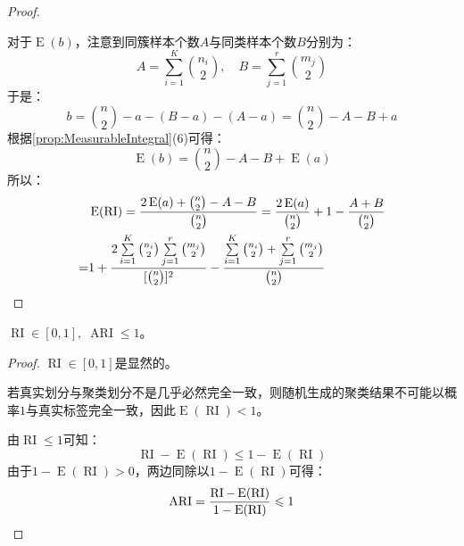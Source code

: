 \begin{proof}
\begin{equation*}
	\end{equation*}\par
	对于$\operatorname{E}(b)$，注意到同簇样本个数$A$与同类样本个数$B$分别为：
	\begin{equation*}
		A=\sum_{i=1}^{K}\binom{n_i}{2},\quad B=\sum_{j=1}^{r}\binom{m_j}{2}
	\end{equation*}
	于是：
	\begin{equation*}
		b=\binom{n}{2}-a-(B-a)-(A-a)=\binom{n}{2}-A-B+a
	\end{equation*}
	根据\cref{prop:MeasurableIntegral}(6)可得：
	\begin{equation*}
		\operatorname{E}(b)=\binom{n}{2}-A-B+\operatorname{E}(a)
	\end{equation*}
	所以：
	\begin{align*}
		&\operatorname{E}(\operatorname{RI})=\frac{2\operatorname{E}(a)+\binom{n}{2}-A-B}{\binom{n}{2}}=\frac{2\operatorname{E}(a)}{\binom{n}{2}}+1-\frac{A+B}{\binom{n}{2}} \\
		=&1+\frac{2\sum\limits_{i=1}^{K}\binom{n_i}{2}\sum\limits_{j=1}^{r}\binom{m_j}{2}}{[\binom{n}{2}]^2}-\frac{\sum\limits_{i=1}^{K}\binom{n_i}{2}+\sum\limits_{j=1}^{r}\binom{m_j}{2}}{\binom{n}{2}}\qedhere
	\end{align*}
\end{proof}
\begin{property}
	$\operatorname{RI}\in[0,1],\;\operatorname{ARI}\leqslant1$。
\end{property}
\begin{proof}
	$\operatorname{RI}\in[0,1]$是显然的。\par
	若真实划分与聚类划分不是几乎必然完全一致，则随机生成的聚类结果不可能以概率$1$与真实标签完全一致，因此$\operatorname{E}(\operatorname{RI})<1$。\par
	由$\operatorname{RI}\leqslant1$可知：
	\begin{equation*}
		\operatorname{RI}-\operatorname{E}(\operatorname{RI})\leqslant1-\operatorname{E}(\operatorname{RI})
	\end{equation*}
	由于$1-\operatorname{E}(\operatorname{RI})>0$，两边同除以$1-\operatorname{E}(\operatorname{RI})$可得：
	\begin{equation*}
		\operatorname{ARI}
		=\frac{\operatorname{RI}-\operatorname{E}(\operatorname{RI})}{1-\operatorname{E}(\operatorname{RI})}\leqslant1\qedhere
	\end{equation*}
\end{proof}
